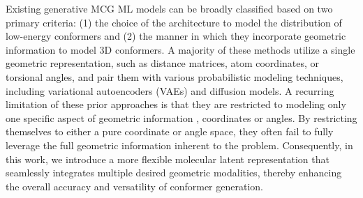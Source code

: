 
Existing generative MCG ML models can be broadly classified based on two primary criteria: (1) the choice of the architecture to model the distribution of low-energy conformers and (2) the manner in which they incorporate geometric information to model 3D conformers. A majority of these methods utilize a single geometric representation, such as distance matrices, atom coordinates, or torsional angles, and pair them with various probabilistic modeling techniques, including variational autoencoders (VAEs) and diffusion models. 
A recurring limitation of these prior approaches is that they are restricted to modeling only one specific aspect of geometric information \ie, coordinates or angles. 
By restricting themselves to either a pure coordinate or angle space, they often fail to fully leverage the full geometric information inherent to the problem. Consequently, in this work, we introduce a more flexible molecular latent representation that seamlessly integrates multiple desired geometric modalities, thereby enhancing the overall accuracy and versatility of conformer generation.


